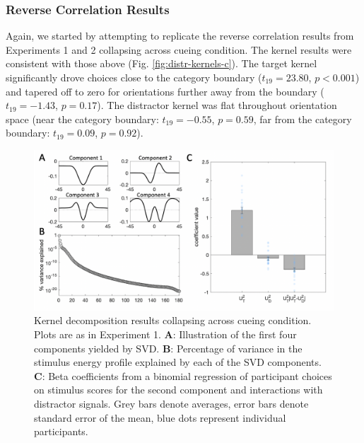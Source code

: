 \documentclass[a4paper, nobind]{templates/ociamthesis}
\begin{document}
\hypertarget{reverse-correlation-results}{%
\subsubsection{Reverse Correlation Results}\label{reverse-correlation-results}}

Again, we started by attempting to replicate the reverse correlation results from Experiments 1 and 2 collapsing across cueing condition. The kernel results were consistent with those above (Fig. \ref{fig:distr-kernels-c}). The target kernel significantly drove choices close to the category boundary (\(t_{19}=23.80\), \(p<0.001\)) and tapered off to zero for orientations further away from the boundary (\(t_{19}=-1.43\), \(p=0.17\)). The distractor kernel was flat throughout orientation space (near the category boundary: \(t_{19}=-0.55\), \(p=0.59\), far from the category boundary: \(t_{19}=0.09\), \(p=0.92\)).

\begin{figure}

{\centering \includegraphics[width=1\linewidth]{figures/distr-svd-c} 

}

\caption[Experiment 3, Kernel decomposition results]{Kernel decomposition results collapsing across cueing condition. Plots are as in Experiment 1.  $\textbf{A:}$ Illustration of the first four components yielded by SVD.  $\textbf{B:}$ Percentage of variance in the stimulus energy profile explained by each of the SVD components.  $\textbf{C:}$ Beta coefficients from a binomial regression of participant choices on stimulus scores for the second component and interactions with distractor signals. Grey bars denote averages, error bars denote standard error of the mean, blue dots represent individual participants.}\label{fig:distr-svd-c}
\end{figure}
\end{document}
